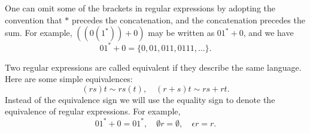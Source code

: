 

\setcounter{section}{2}
\setcounter{subsection}{1}
\setcounter{dfn}{1}



One can omit some of the brackets in regular expressions by adopting the convention that $*$ precedes the concatenation, and the concatenation precedes the sum.
For example, $((0(1^*))+0)$ may be written as $01^* + 0$, and we have
\[
01^* + 0 = \{0, 01, 011, 0111, \ldots\}.
\]

Two regular expressions are called equivalent if they describe the same language.
Here are some simple equivalences:
\[
(rs)t \sim rs(t), \quad (r+s)t \sim rs + rt.
\]
Instead of the equivalence sign we will use the equality sign to denote the equivalence of regular expressions.
For example,
\[
01^* + 0 = 01^*, \quad \emptyset r = \emptyset, \quad \epsilon r = r.
\]




